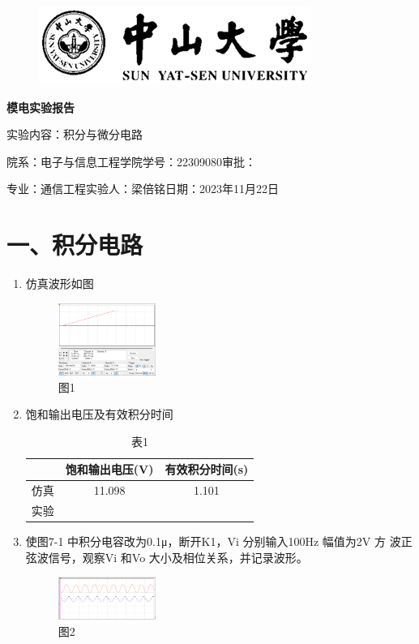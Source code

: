 \documentclass[a4paper,10pt,notitlepage]{article}
\begin{document}
	\large
	\onehalfspacing
	\begin{figure}[h]
		\raggedright
		\includegraphics{1.png}
	\end{figure}
	\centering
	{\Huge\textbf{模电实验报告}\par}
	\vspace{0.2cm}
	{\huge{实验内容：积分与微分电路}\par}
	\raggedright
	\vspace{0.3cm}
	\begin{centering}
		{\large 院系：电子与信息工程学院\hfill 学号：22309080\hfill 审批：\hspace{2cm} \par
			专业：通信工程\hfill 实验人：梁倍铭\hfill 日期：2023年11月22日 \par}
	\end{centering}
	\vspace{0.3cm}
	\section*{一、积分电路}
	\begin{enumerate}
	\item 仿真波形如图
	\begin{figure}[h]
		\centering
		\includegraphics[width=0.3\textwidth]{2.png}
		\caption*{图1}
	\end{figure}
	\item 饱和输出电压及有效积分时间
	\begin{table}[h]
		\centering
		\begin{tabular}{|c|c|c|}
			\hline
			& 饱和输出电压(V) & 有效积分时间(s) \\
			\hline
			仿真 & 11.098 & 1.101 \\
			\hline 
			实验 & \qquad & \qquad \\
			\hline
		\end{tabular}
		\caption*{表1}
	\end{table}
	\item 使图7-1 中积分电容改为0.1μ，断开K1，Vi 分别输入100Hz 幅值为2V 方
	波正弦波信号，观察Vi 和Vo 大小及相位关系，并记录波形。
	\newpage
	\begin{figure}[h]
		\centering
		\includegraphics[width=0.3\textwidth]{3.png}
		\caption*{图2}
	\end{figure}
\end{enumerate}
\end{document}
